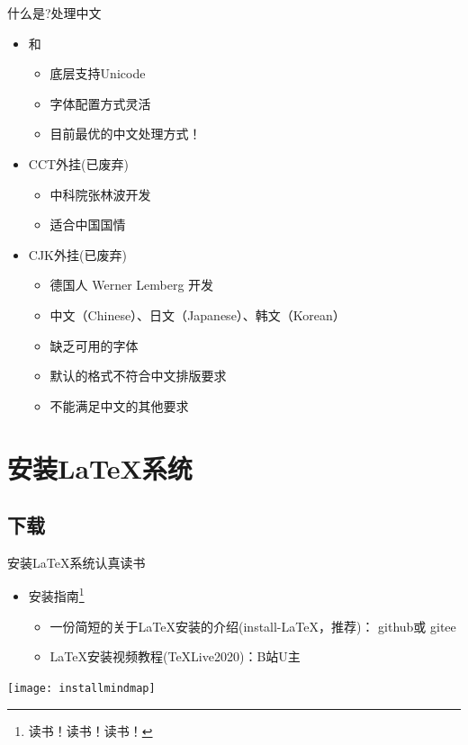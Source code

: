 \documentclass[fontset = none, xcolor=svgnames, t, aspectratio=169]{ctexbeamer}
\begin{document}
\begin{frame}[t]{什么是\latex?}{处理中文}
  \stretchon
  \begin{itemize}
  \item \XeTeX 和\XeLaTeX
    \begin{itemize}
    \item 底层支持Unicode
    \item 字体配置方式灵活
    \item \alert{目前最优的中文处理方式！}
    \end{itemize}
  \item CCT外挂(\alert{已废弃})
    \begin{itemize}
    \item 中科院张林波开发
    \item 适合中国国情
    \end{itemize}  
  \item CJK外挂(\alert{已废弃})
    \begin{itemize}
    \item 德国人 Werner Lemberg 开发
    \item 中文（\alert{C}hinese）、日文（\alert{J}apanese）、韩文（\alert{K}orean）
    \item 缺乏可用的字体
    \item 默认的格式不符合中文排版要求
    \item 不能满足中文的其他要求
    \end{itemize}  
  \end{itemize}
  \stretchoff
\end{frame}

\section[安装\LaTeX ]{安装\LaTeX 系统}\label{sec01-04}
\subsection[下载]{下载}
\begin{frame}[t]{安装\LaTeX 系统}{认真读书}
  \stretchon
  \begin{itemize}
  \item 安装指南\footnote[frame,1]{读书！读书！读书！}  
    \begin{itemize}
    \item
      一份简短的关于\LaTeX{}安装的介绍(install-LaTeX，\alert{推荐})：
      github或
      gitee
    \item \LaTeX{}安装视频教程(TeXLive2020)：B站U主
    \end{itemize}
  \end{itemize}  
  \stretchoff
  \begin{center}
    \texttt{[image: installmindmap]}
  \end{center}  
\end{frame}
\end{document}
